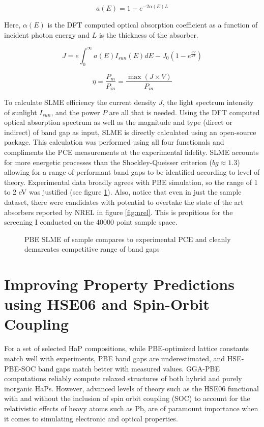 \begin{equation}
\label{eq:absorption_alpha}
a(E)=1-e^{-2\alpha(E)L}
\end{equation}

Here, \(\alpha(E)\) is the DFT computed optical absorption coefficient
as a function of incident photon energy and \(L\) is the thickness of
the absorber.

\begin{equation}
\label{eq:slme_int}
J=e\int_{0}^{\infty} a(E)I_{sun}(E)dE - J_{0}(1-e^{\frac{eV}{kT}})
\end{equation}

\begin{equation}
\label{eq:slme_sum}
\eta = \frac{P_{m}}{P_{in}}=\frac{\max(J \times V)}{P_{in}}
\end{equation}

To calculate SLME efficiency the current density \(J\), the light spectrum intensity of sunlight \(I_{sun}\), and the power \(P\) are all that is needed.
Using the DFT computed optical absorption spectrum as well as the magnitude and type (direct or indirect) of band gap as input, SLME is directly calculated using an open-source package.
\autocite{williams-2022-sl3me}
This calculation was performed using all four functionals and compliments the PCE measurements at the experimental fidelity.
SLME accounts for more energetic processes than the Shockley-Queisser criterion (\(bg \approx 1.3\)) allowing for a range of performant band gaps to be identified according to level of theory.
\autocite[p.1]{yu-2012-ident-poten}
Experimental data \autocite{almora-2020-devic-perfor} broadly agrees with PBE simulation, so the range of 1 to 2 \unit{\electronvolt} was justified (see figure \ref{fig:slme}).
Also, notice that even in just the sample dataset, there were candidates with potential to overtake the state of the art absorbers reported by NREL in figure \ref{fig:nrel}.
This is propitious for the screening I conducted on the 40000 point sample space.

 
\begin{figure}[htbp]
\centering

\caption{\label{fig:slme} PBE SLME of sample compares to experimental PCE and cleanly demarcates competitive range of band gaps}
\end{figure}

\section{Improving Property Predictions using HSE06 and Spin-Orbit Coupling}
\label{sec:orgde30719}
For a set of selected HaP compositions, while PBE-optimized lattice constants match well with experiments, PBE band gaps are underestimated, and HSE-PBE-SOC band gaps match better with measured values.
GGA-PBE computations reliably compute relaxed structures of both hybrid and purely inorganic HaPs.
However, advanced levels of theory such as the HSE06 functional with and without the inclusion of spin orbit coupling (SOC) to account for the relativistic effects of heavy atoms such as Pb, are of paramount importance when it comes to simulating electronic and optical properties.


